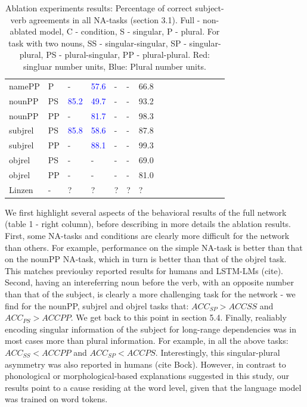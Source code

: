 \begin{center}
\begin{table}[ht]
\begin{tabular}{|P{1.4cm}|P{0.4cm}||P{0.6cm}|P{0.6cm}|P{0.6cm}|P{0.6cm}|P{0.6cm}|P{0.6cm}|P{0.6cm}|P{0.6cm}|P{0.6cm}|P{0.6cm}|P{0.6cm}|P{0.6cm}||P{0.6cm}|}
\B namePP & \B P & - &  \textcolor{blue}{57.6} &  - &  - &  66.8 \\

\B nounPP & \B PS &  \textcolor{blue}{85.2} &  \textcolor{blue}{49.7} & - &  - &  93.2 \\

\B nounPP & \B PP &  - &  \textcolor{blue}{81.7} &  - &  - &  98.3 \\

\B subjrel & \B PS &  \textcolor{blue}{85.8}  &  \textcolor{blue}{58.6}  &  - &  - &  87.8 \\

\B subjrel & \B PP &  - &  \textcolor{blue}{88.1} &  - &  - &  99.3 \\

\B objrel & \B PS & - &  - &  - &  - &  69.0 \\

\B objrel & \B PP &  - &  - &  - &  - &  81.0 \\
\hline
\hline
\B Linzen & \B - &  ? &  ? &  ? &  ? &  ? \\
\hline
\end{tabular}
\caption{Ablation experiments results: Percentage of correct subject-verb agreements in all NA-tasks (section 3.1). Full - non-ablated model, C - condition, S - singular, P - plural. For task with two nouns, SS - singular-singular, SP - singular-plural, PS - plural-singular, PP - plural-plural. Red: singluar number units, Blue: Plural number units.}
\end{table}
\end{center}

We first highlight several aspects of the behavioral results of the full network (table 1 - right column), before describing in more details the ablation results. First, some NA-tasks and conditions are clearly more difficult for the network than others. For example, performance on the simple NA-task is better than that on the nounPP NA-task, which in turn is better than that of the objrel task. This matches previoulsy reported results for humans and LSTM-LMs (cite). Second, having an intereferring noun before the verb, with an opposite number than that of the subject, is clearly a more challenging task for the network - we find for the nounPP, subjrel and objrel tasks that: $ACC_{SP}>ACC{SS}$ and $ACC_{PS}>ACC{PP}$. We get back to this point in section 5.4. Finally, realiably encoding singular information of the subject for long-range dependencies was in most cases more than plural information. For example, in all the above tasks: $ACC_{SS}<ACC{PP}$ and $ACC_{SP}<ACC{PS}$. Interestingly, this singular-plural asymmetry was also reported in humans (cite Bock). However, in contrast to phonological or morphological-based explanations suggested in this study, our results point to a cause residing at the word level, given that the language model was trained on word tokens.

